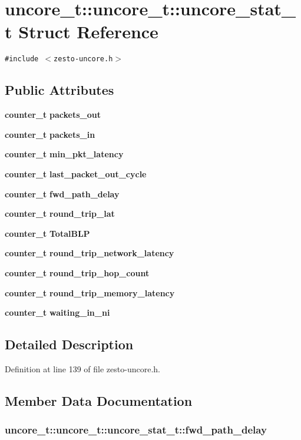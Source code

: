 \section{uncore\_\-t::uncore\_\-t::uncore\_\-stat\_\-t Struct Reference}
\label{structuncore__t_1_1uncore__stat__t}
{\tt \#include $<$zesto-uncore.h$>$}

\subsection*{Public Attributes}
\begin{CompactItemize}
\item 
{\bf counter\_\-t} {\bf packets\_\-out}
\item 
{\bf counter\_\-t} {\bf packets\_\-in}
\item 
{\bf counter\_\-t} {\bf min\_\-pkt\_\-latency}
\item 
{\bf counter\_\-t} {\bf last\_\-packet\_\-out\_\-cycle}
\item 
{\bf counter\_\-t} {\bf fwd\_\-path\_\-delay}
\item 
{\bf counter\_\-t} {\bf round\_\-trip\_\-lat}
\item 
{\bf counter\_\-t} {\bf TotalBLP}
\item 
{\bf counter\_\-t} {\bf round\_\-trip\_\-network\_\-latency}
\item 
{\bf counter\_\-t} {\bf round\_\-trip\_\-hop\_\-count}
\item 
{\bf counter\_\-t} {\bf round\_\-trip\_\-memory\_\-latency}
\item 
{\bf counter\_\-t} {\bf waiting\_\-in\_\-ni}
\end{CompactItemize}


\subsection{Detailed Description}


Definition at line 139 of file zesto-uncore.h.

\subsection{Member Data Documentation}
\subsubsection[{fwd\_\-path\_\-delay}]{ uncore\_\-t::uncore\_\-t::uncore\_\-stat\_\-t::fwd\_\-path\_\-delay}\label{structuncore__t_1_1uncore__stat__t_4f50caf158350ab92292ca05e56309c6}




